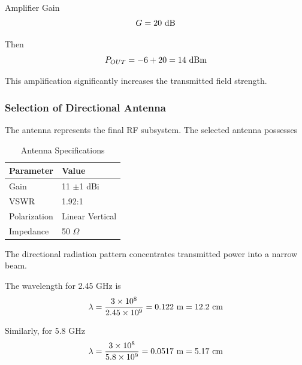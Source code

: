 \documentclass[12pt,a4paper]{report}
\begin{document}
	Amplifier Gain
	\begingroup
	\setlength{\mathindent}{0pt}
	\begin{equation*}
		\hfill
		G = 20\ \text{dB}
		\hfill
	\end{equation*}
	\endgroup
	
	Then
	\begingroup
	\setlength{\mathindent}{0pt}
	\begin{equation*}
		\hfill
		P_{OUT} = -6 + 20 = 14\ \text{dBm}
		\hfill
	\end{equation*}
	\endgroup
	
	This amplification significantly increases the transmitted field strength.
	
	\subsubsection{Selection of Directional Antenna}
	
	The antenna represents the final RF subsystem. The selected antenna possesses
	
	\begin{table}[htbp]
		\centering
		\begin{tabular}{p{5cm} p{5cm}}
			\toprule
			\textbf{Parameter} & \textbf{Value} \\
			\midrule
			Gain & 11 $\pm$1 dBi \\
			VSWR & 1.92:1 \\
			Polarization & Linear Vertical \\
			Impedance & 50 $\Omega$ \\
			\bottomrule
		\end{tabular}
		\caption{Antenna Specifications}
		\label{tab:antenna_specs}
	\end{table}
	
	The directional radiation pattern concentrates transmitted power into a narrow beam.
	
	The wavelength for 2.45 GHz is
	\begingroup
	\setlength{\mathindent}{0pt}
	\begin{equation*}
		\hfill
		\lambda = \frac{3 \times 10^8}{2.45 \times 10^9} = 0.122\ \text{m} = 12.2\ \text{cm}
		\hfill
	\end{equation*}
	\endgroup
	
	Similarly, for 5.8 GHz
	\begingroup
	\setlength{\mathindent}{0pt}
	\begin{equation*}
		\hfill
		\lambda = \frac{3 \times 10^8}{5.8 \times 10^9} = 0.0517\ \text{m} = 5.17\ \text{cm}
		\hfill
	\end{equation*}
	\endgroup
	
\end{document}
